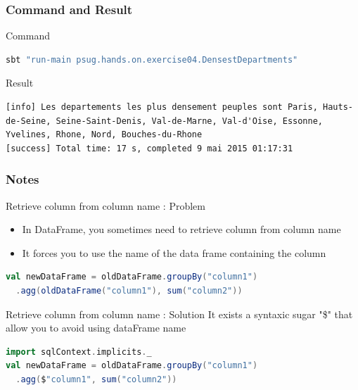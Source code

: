 \documentclass[slidetop,9pt,utf8]{beamer}
\begin{document}
\begin{frame}[fragile]
  \frametitle{Command and Result}

  \begin{block}{Command}
    \begin{lstlisting}[language=bash, style=terminal-medium]
sbt "run-main psug.hands.on.exercise04.DensestDepartments"
    \end{lstlisting}
  \end{block}

  \begin{block}{Result}
    \begin{lstlisting}[style=terminal]
[info] Les departements les plus densement peuples sont Paris, Hauts-de-Seine, Seine-Saint-Denis, Val-de-Marne, Val-d'Oise, Essonne, Yvelines, Rhone, Nord, Bouches-du-Rhone
[success] Total time: 17 s, completed 9 mai 2015 01:17:31
    \end{lstlisting}
  \end{block}

\end{frame}

\begin{frame}[fragile]
  \frametitle{Notes}

  \begin{exampleblock}{Retrieve column from column name : Problem}
    \begin{itemize}
      \item In DataFrame, you sometimes need to retrieve column from column name
      \item It forces you to use the name of the data frame containing the column
    \end{itemize}
  \end{exampleblock}

  \begin{lstlisting}[label=columnNameProblem, caption=Use the name of the dataFrame containing the column to retrieve column, language=scala, style=code]
val newDataFrame = oldDataFrame.groupBy("column1")
  .agg(oldDataFrame("column1"), sum("column2"))
  \end{lstlisting}

  \begin{exampleblock}{Retrieve column from column name : Solution}
    It exists a syntaxic sugar "\$" that allow you to avoid using dataFrame name
  \end{exampleblock}

  \begin{lstlisting}[label=changeNameSelectedColumn, caption=Use "\$" and retrieve directly column from column name, language=scala, style=code]
import sqlContext.implicits._
val newDataFrame = oldDataFrame.groupBy("column1")
  .agg($"column1", sum("column2"))
  \end{lstlisting}

\end{frame}
\end{document}
